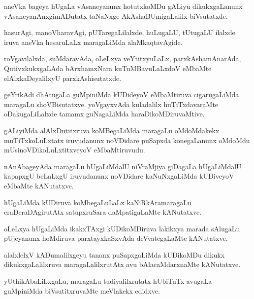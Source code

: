 \documentclass{article}
\begin{document}
\begin{mn}
aneVka bageya hUgaLa vAsaneyanunx hotutxkoMDu gALiyu dikukxgaLanunx
vAsaneyanAnxgimADutatx taNaNxge AkAshaBUmigaLalilx biVsutatxde.
\end{mn}

\begin{mn}
hasurAgi, manoVharavAgi, pUTaregaLilalxde, huLugaLU, tUtugaLU ilalxde
iruva aneVka hesaruLaLx maragaLiMda alaMkaqtavAgide.
\end{mn}

\begin{mn}
roVgavilalxda, suMdaravAda, oLeLxya veYtitxyuLaLx, parxkAshamAnarAda,
QutivxkukxgaLAda bArxhamxNara kuTuMBavuLaLxdoV eMbaMte
elAlxkaDeyalilxyU parxkAshisutatxde.
\end{mn}

\begin{mn}
geYrikAdi dhAtugaLa guMpiniMda kUDideyoV eMbaMtiruva cigarugaLiMda
maragaLu shoVBisutatxve. yoVgayxvAda kuladalilx huTiTxdavaraMte
oDakugaLiLalxde tamamx guNagaLiMda haraDikoMDiruvaMtive.
\end{mn}

\begin{mn}%
gALiyiMda alAlxDutitxruva koMBegaLiMda maragaLu oMdoMdakekx
muTiTxkoLuLxtatx iruvudanunx noVDidare puSapxda konegaLanunx oMdoMdu
mUsinoVDikoLuLxtitxveyoV eMbaMtiruvudu.
\end{mn}

\begin{mn}
nAnAbageyAda maragaLu hUgaLiMdalU niVraMjiya giDagaLa hUgaLiMdalU
kapapxgU beLaLxgU iruvudanunx noVDidare kaNuNxgaLiMda kUDiveyoV
eMbaMte kANutatxve.
\end{mn}

\begin{mn}
hUgaLiMda kUDiruva koMbegaLuLaLx kaNiRkAramaragaLu eraDeraDAgirutAtx
satupxruSara daMpatigaLaMte kANutatxve.
\end{mn}

\begin{mn}
oLeLxya hUgaLiMda ikakxTAxgi kUDikoMDiruva lakikxya marada sAlugaLu
pUjeyanunx hoMdiruva parxtayxkaSxvAda deVvategaLaMte kANutatxve.
\end{mn}

\begin{mn}
alalxlelxV kADumalilxgeyu tananx puSapxgaLiMda kUDikoMDu dikukx
dikukxgaLalilxruva maragaLalilxrutAtx avu bAlacaMdarxnaMte kANutatxve.
\end{mn}

\begin{mn}%
yUthikAbaLiLxgaLu, maragaLu tudiyalilxrutatx hUbiTuTx avugaLa
guMpiniMda biVsutitxruvaMte meVlakekx edidxve.
\end{mn}
\end{document}
